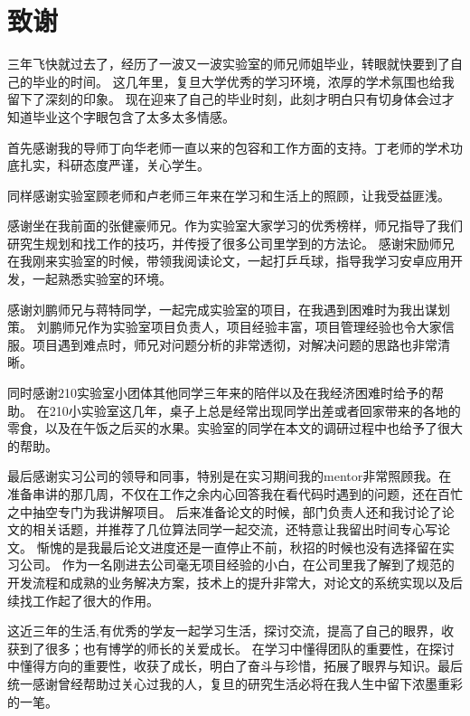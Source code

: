 \chapter{致谢}

三年飞快就过去了，经历了一波又一波实验室的师兄师姐毕业，转眼就快要到了自己的毕业的时间。 
这几年里，复旦大学优秀的学习环境，浓厚的学术氛围也给我留下了深刻的印象。
现在迎来了自己的毕业时刻，此刻才明白只有切身体会过才知道毕业这个字眼包含了太多太多情感。

首先感谢我的导师丁向华老师一直以来的包容和工作方面的支持。丁老师的学术功底扎实，科研态度严谨，关心学生。


同样感谢实验室顾老师和卢老师三年来在学习和生活上的照顾，让我受益匪浅。

感谢坐在我前面的张健豪师兄。作为实验室大家学习的优秀榜样，师兄指导了我们研究生规划和找工作的技巧，并传授了很多公司里学到的方法论。
感谢宋励师兄在我刚来实验室的时候，带领我阅读论文，一起打乒乓球，指导我学习安卓应用开发，一起熟悉实验室的环境。

感谢刘鹏师兄与蒋特同学，一起完成实验室的项目，在我遇到困难时为我出谋划策。
刘鹏师兄作为实验室项目负责人，项目经验丰富，项目管理经验也令大家信服。项目遇到难点时，师兄对问题分析的非常透彻，对解决问题的思路也非常清晰。

同时感谢210实验室小团体其他同学三年来的陪伴以及在我经济困难时给予的帮助。
在210小实验室这几年，桌子上总是经常出现同学出差或者回家带来的各地的零食，以及在午饭之后买的水果。实验室的同学在本文的调研过程中也给予了很大的帮助。

最后感谢实习公司的领导和同事，特别是在实习期间我的mentor非常照顾我。在准备串讲的那几周，不仅在工作之余内心回答我在看代码时遇到的问题，还在百忙之中抽空专门为我讲解项目。
后来准备论文的时候，部门负责人还和我讨论了论文的相关话题，并推荐了几位算法同学一起交流，还特意让我留出时间专心写论文。
惭愧的是我最后论文进度还是一直停止不前，秋招的时候也没有选择留在实习公司。
作为一名刚进去公司毫无项目经验的小白，在公司里我了解到了规范的开发流程和成熟的业务解决方案，技术上的提升非常大，对论文的系统实现以及后续找工作起了很大的作用。



这近三年的生活,有优秀的学友一起学习生活，探讨交流，提高了自己的眼界，收获到了很多；也有博学的师长的关爱成长。
在学习中懂得团队的重要性，在探讨中懂得方向的重要性，收获了成长，明白了奋斗与珍惜，拓展了眼界与知识。最后统一感谢曾经帮助过关心过我的人，复旦的研究生活必将在我人生中留下浓墨重彩的一笔。